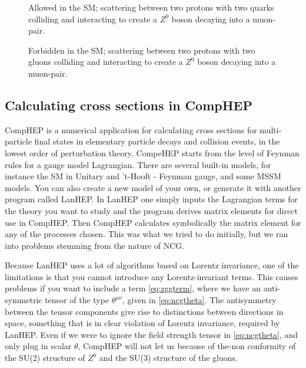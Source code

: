 \begin{figure}[htp]
	\centering
	\begin{minipage}[b]{0.475\linewidth} 
    \centering
	  
	  \caption{Allowed in the SM; scattering between two protons with two quarks colliding and interacting to create a $Z^0$ boson decaying into a muon-pair.} \label{fig:feyn:parton_qq}
	\end{minipage}
	\hspace{0.5cm}
	\begin{minipage}[b]{0.475\linewidth} 
    \centering
	  
	  \caption{Forbidden in the SM; scattering between two protons with two gluons colliding and interacting to create a $Z^0$ boson decaying into a muon-pair.} \label{fig:feyn:parton_gg}%
	\end{minipage}
\end{figure}


\subsection{Calculating cross sections in CompHEP}

CompHEP is a numerical application for calculating cross sections for multi-particle final states in elementary particle decays and collision events, in the lowest order of perturbation theory. CompeHEP starts from the level of Feynman rules for a gauge model Lagrangian. There are several built-in models, for instance the SM in Unitary and 't-Hooft - Feynman gauge, and some MSSM models. You can also create a new model of your own, or generate it with another program called LanHEP. In LanHEP one simply inputs the Lagrangian terms for the theory you want to study and the program derives matrix elements for direct use in CompHEP. Then CompHEP calculates symbolically the matrix element for any of the processes chosen. This was what we tried to do initially, but we ran into problems stemming from the nature of NCG.

Because LanHEP uses a lot of algorithms based on Lorentz invariance, one of the limitations is that you cannot introduce any Lorentz-invariant terms. This causes problems if you want to include a term \eqref{eq:zggterm}, where we have an anti-symmetric tensor of the type $\theta^{\mu\nu}$, given in \eqref{eq:ncgtheta}. The antisymmetry between the tensor components give rise to distinctions between directions in space, something that is in clear violation of Lorentz invariance, required by LanHEP. Even if we were to ignore the field strength tensor in \eqref{eq:ncgtheta}, and only plug in scalar $\theta$, CompHEP will not let us because of the-non conformity of the SU(2) structure of $Z^0$ and the SU(3) structure of the gluons.

